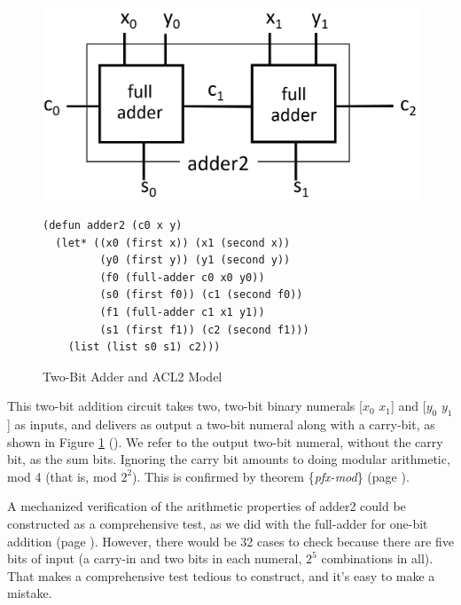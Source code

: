 \begin{figure}
\begin{center}
\includegraphics[scale=0.25]{Images/adder2.png}
\begin{Verbatim}
(defun adder2 (c0 x y)
  (let* ((x0 (first x)) (x1 (second x))
         (y0 (first y)) (y1 (second y))
         (f0 (full-adder c0 x0 y0))
         (s0 (first f0)) (c1 (second f0))
         (f1 (full-adder c1 x1 y1))
         (s1 (first f1)) (c2 (second f1)))
    (list (list s0 s1) c2)))
\end{Verbatim}
\end{center}
\caption{Two-Bit Adder and ACL2 Model}
\label{fig:adder2}
\end{figure}

This two-bit addition circuit takes two, two-bit binary numerals
[$x_0$ $x_1$] and [$y_0$ $y_1$] as inputs, and
delivers as output a two-bit numeral along with a carry-bit,
as shown in Figure \ref{fig:adder2} (\pageref{fig:adder2}).
We refer to the output two-bit numeral, without the carry bit,
as the sum bits.
Ignoring the carry bit amounts to doing
modular arithmetic, mod 4 (that is, mod $2^2$).
This is confirmed by theorem \{\emph{pfx-mod}\} (page \pageref{pfx-mod}).

A mechanized verification of the arithmetic properties of adder2
could be constructed as a comprehensive test,
as we did with the full-adder for one-bit addition
(page \pageref{full-adder-model-check}).
However, there would be 32 cases to check
because there are five bits of input
(a carry-in and two bits in each numeral, $2^5$ combinations in all).
That makes a comprehensive test tedious to construct,
and it's easy to make a mistake.

